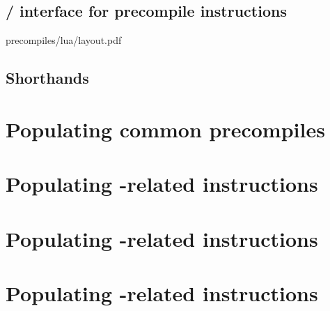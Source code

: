 \subsection{\hubMod{} / \oobMod{} interface for precompile instructions}   \label{oob: hub / oob interface for precompiles}   {precompiles/lua/layout.pdf}
\subsection{Shorthands}                                                    \label{oob: populating: shorthands}               
\section{Populating common precompiles}                                    \label{oob: populating: common precompiles}       
\section{Populating \instModexp{}-related \oobMod{} instructions}          \label{oob: populating: modexp}                   
\section{Populating \instBlake{}-related \oobMod{} instructions}           \label{oob: populating: blake2f}                  
\section{Populating -related \oobMod{} instructions}             \label{oob: populating: bls}                      
